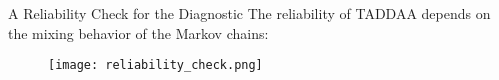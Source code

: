 \documentclass[10pt,xcolor=table]{beamer}
\begin{document}
\begin{frame}{A Reliability Check for the Diagnostic}
The reliability of TADDAA depends on the mixing behavior of the Markov chains: 

\begin{figure}[t]
	\texttt{[image: reliability\_check.png]}
\end{figure}

\end{frame}
\end{document}
